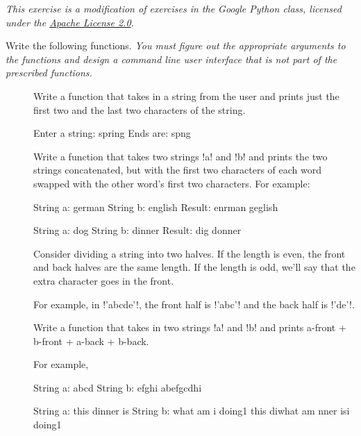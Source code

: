 \documentclass[11pt]{cselabheader}
\begin{document}
\begin{ex}[stringfun.py] 
\emph{This exercise is a modification of exercises in the Google Python
  class, licensed under the
  \href{http://www.apache.org/licenses/LICENSE-2.0.html}{Apache License 2.0}.}

Write the following functions. \emph{You must figure out the appropriate
  arguments to the functions and design a command line user interface that is
not part of the prescribed functions.}

\begin{description}
  \item[]
  Write a function that takes in a string from the user and
  prints just the first two and the last two characters of the string.

  \begin{verbatimcode}
Enter a string: spring
Ends are: spng
  \end{verbatimcode}

  \item[]
Write a function that takes two strings \pythoninline!a! and
  \pythoninline!b! and prints the two strings concatenated, but with the first
  two characters of each word swapped with the other word's first two
  characters. For example:

  \begin{verbatimcode}
String a: german
String b: english
Result: enrman geglish
  \end{verbatimcode}

  \begin{verbatimcode}
String a: dog
String b: dinner
Result: dig donner
  \end{verbatimcode}

  \item[]
Consider dividing a string into two halves. If the length
  is even, the front and back halves are the same length. If the length is odd,
  we'll say that the extra character goes in the front. 

  For example, in \pythoninline!'abcde'!, the front half is \pythoninline!'abc'!
  and the back half is \pythoninline!'de'!. 

  Write a function that takes in two strings \pythoninline!a! and
  \pythoninline!b!  and prints a-front + b-front + a-back + b-back.

  For example,

  \begin{verbatimcode}
String a: abcd
String b: efghi
abefgcdhi
  \end{verbatimcode}

  \begin{verbatimcode}
String a: this dinner is
String b: what am i doing1
this diwhat am nner isi doing1
  \end{verbatimcode}
\end{description}

\end{ex}
\end{document}

